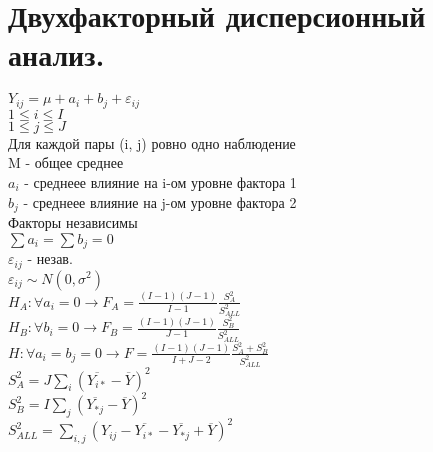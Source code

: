 \documentclass{article}
\newcommand\0{\mathbb{0}}
\newcommand\1{\mathbb{1}}
\begin{document}
\section{Двухфакторный дисперсионный анализ.}
$Y_{ij} = \mu + a_i + b_j + \varepsilon_{ij}$\\
$1 \leq i \leq I$\\
$1 \leq j \leq J$\\
Для каждой пары (i, j) ровно одно наблюдение\\
M - общее среднее\\
$a_i$ - среднеее влияние на i-ом уровне фактора 1\\
$b_j$ - среднеее влияние на j-ом уровне фактора 2\\
Факторы независимы\\
$\displaystyle\sum a_i = \displaystyle\sum b_j = 0$\\
$\varepsilon_{ij}$ - незав.\\
$\varepsilon_{ij} \sim N(0, \sigma^2)$\\
$H_A: \forall a_i = 0 \to F_A = \frac{(I - 1)(J - 1)}{I - 1} \frac{S^2_A}{S^2_{ALL}}$\\
$H_B: \forall b_i = 0 \to F_B = \frac{(I - 1)(J - 1)}{J - 1} \frac{S^2_B}{S^2_{ALL}}$\\
$H: \forall a_i = b_j = 0 \to F = \frac{(I - 1)(J - 1)}{I + J - 2}\frac{S^2_A + S^2_B}{S^2_{ALL}}$\\
$S^2_A = J \displaystyle\sum_i (\overline{Y_{i*}} - \overline{Y})^2$\\
$S^2_B = I \displaystyle\sum_j (\overline{Y_{*j}} - \overline{Y})^2$\\
$S^2_{ALL} = \displaystyle\sum_{i,j}(Y_{ij} - \overline{Y_{i*}} - \overline{Y_{*j}} + \overline{Y})^2$
\end{document}
